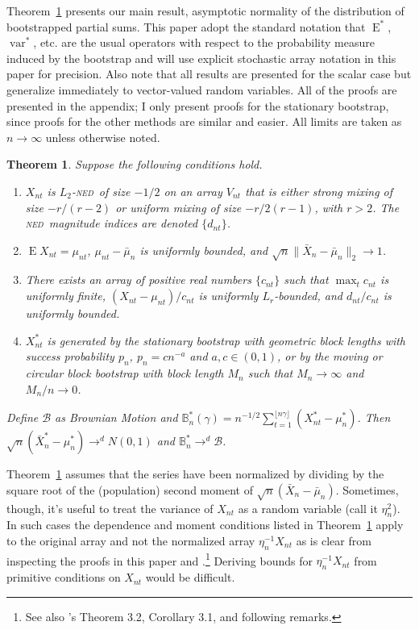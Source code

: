 \documentclass[12pt]{article}
\newcommand\citepos[2][]{\citeauthor{#2}'s \citeyearpar[#1]{#2}}
\newtheorem{thm}{Theorem}
\theoremstyle{definition}
\DeclareMathOperator{\E}{E}
\DeclareMathOperator{\var}{var}
\newcommand{\ned}{\textsc{ned}}
\begin{document}
Theorem~\ref{res:C} presents our main result, asymptotic normality of
the distribution of bootstrapped partial sums.  This paper adopt the
standard notation that $\E^{*}$, $\var^{*}$, etc. are the usual
operators with respect to the probability measure induced by the
bootstrap and will use explicit stochastic array notation in this
paper for precision.  Also note that all results are presented for the
scalar case but generalize immediately to vector-valued random
variables.  All of the proofs are presented in the appendix; I only
present proofs for the stationary bootstrap, since proofs for the
other methods are similar and easier.  All limits are taken as $n \to
\infty$ unless otherwise noted.

\begin{thm}\label{res:C}
  Suppose the following conditions hold.
  \begin{enumerate}
  \item $X_{nt}$ is $L_2$-\ned\ of size $-1/2$ on an array $V_{nt}$
    that is either strong mixing of size $-r/(r-2)$ or uniform mixing
    of size $-r/2(r-1)$, with $r > 2$.  The \ned\ magnitude indices
    are denoted $\{d_{nt}\}$.
  \item $\E X_{nt} = \mu_{nt}$, $\mu_{nt} - \bar \mu_n$ is uniformly
    bounded, and $\sqrt{n} \| \bar{X}_{n} - \bar\mu_n \|_2 \to 1$.
  \item There exists an array of positive real numbers $\{c_{nt}\}$
    such that $\max_t c_{nt}$ is uniformly finite, $(X_{nt} -
    \mu_{nt})/c_{nt}$ is uniformly $L_r$-bounded, and $d_{nt}/c_{nt}$
    is uniformly bounded.
  \item $X_{nt}^{*}$ is generated by the stationary bootstrap with
    geometric block lengths with success probability $p_n$, $p_n = c
    n^{-a}$ and $a,c \in (0,1)$, or by the moving or circular block
    bootstrap with block length $M_n$ such that $M_n \to \infty$ and
    $M_n/n \to 0$.
  \end{enumerate}
  Define $\mathcal{B}$ as Brownian Motion and
  $\mathbb{B}_n^{*}(\gamma) = n^{-1/2} \sum_{t=1}^{\lfloor n \gamma
    \rfloor} (X_{nt}^{*} - \mu_{n}^{*})$.  Then
  $\sqrt{n}(\bar{X}_n^{*} - \mu_n^{*}) \to^d N(0,1)$ and
  $\mathbb{B}_n^{*} \to^d \mathcal{B}$.
\end{thm}

Theorem~\ref{res:C} assumes that the series have been normalized by
dividing by the square root of the (population) second moment of
$\sqrt{n} (\bar{X}_n - \bar{\mu}_n)$.  Sometimes, though, it's useful
to treat the variance of $X_{nt}$ as a random variable (call it
$\eta^2_n$).  In such cases the dependence and moment conditions
listed in Theorem~\ref{res:C} apply to the original array and not the
normalized array $\eta^{-1}_n X_{nt}$ as is clear from inspecting the
proofs in this paper and \citet{Jon:97}.\footnote{See also
  \citepos{HaH:80} Theorem 3.2, Corollary 3.1, and following remarks.}
Deriving bounds for $\eta_n^{-1} X_{nt}$ from primitive conditions on
$X_{nt}$ would be difficult.
\end{document}
